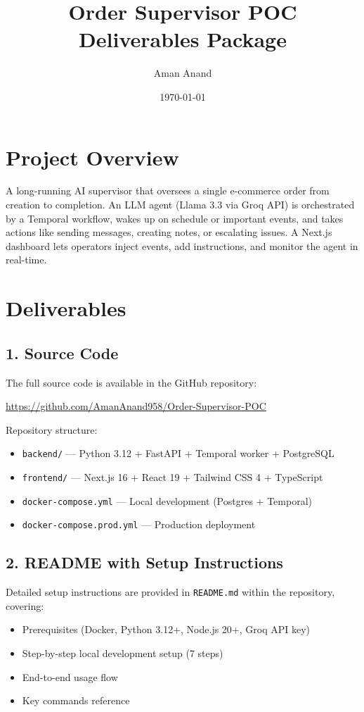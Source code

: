 \documentclass[11pt,a4paper]{article}
\title{\textbf{Order Supervisor POC} \\ \large Deliverables Package}
\author{Aman Anand}
\date{\today}
\begin{document}
\maketitle

\section*{Project Overview}

A long-running AI supervisor that oversees a single e-commerce order from creation to completion. An LLM agent (Llama 3.3 via Groq API) is orchestrated by a Temporal workflow, wakes up on schedule or important events, and takes actions like sending messages, creating notes, or escalating issues. A Next.js dashboard lets operators inject events, add instructions, and monitor the agent in real-time.

\section*{Deliverables}

\subsection*{1. Source Code}
The full source code is available in the GitHub repository:

\url{https://github.com/AmanAnand958/Order-Supervisor-POC}

\noindent Repository structure:
\begin{itemize}[nosep]
    \item \texttt{backend/} — Python 3.12 + FastAPI + Temporal worker + PostgreSQL
    \item \texttt{frontend/} — Next.js 16 + React 19 + Tailwind CSS 4 + TypeScript
    \item \texttt{docker-compose.yml} — Local development (Postgres + Temporal)
    \item \texttt{docker-compose.prod.yml} — Production deployment
\end{itemize}

\subsection*{2. README with Setup Instructions}
Detailed setup instructions are provided in \texttt{README.md} within the repository, covering:
\begin{itemize}[nosep]
    \item Prerequisites (Docker, Python 3.12+, Node.js 20+, Groq API key)
    \item Step-by-step local development setup (7 steps)
    \item End-to-end usage flow
    \item Key commands reference
\end{itemize}
\end{document}
